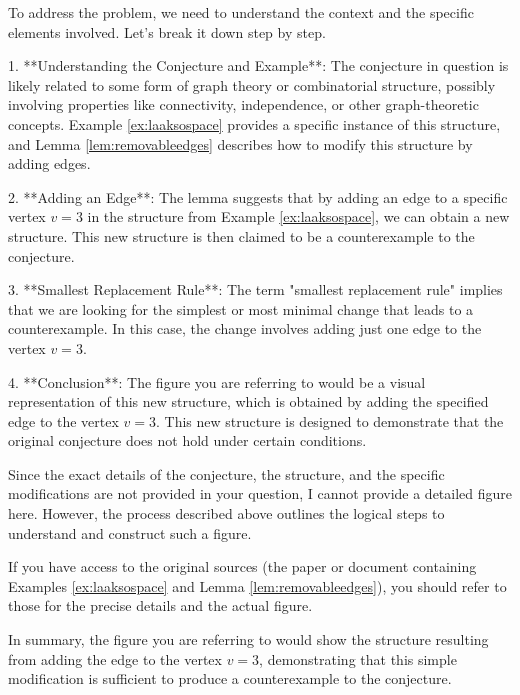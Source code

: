 To address the problem, we need to understand the context and the specific elements involved. Let's break it down step by step.

1. **Understanding the Conjecture and Example**: The conjecture in question is likely related to some form of graph theory or combinatorial structure, possibly involving properties like connectivity, independence, or other graph-theoretic concepts. Example \ref{ex:laaksospace} provides a specific instance of this structure, and Lemma \ref{lem:removableedges} describes how to modify this structure by adding edges.

2. **Adding an Edge**: The lemma suggests that by adding an edge to a specific vertex \( v = 3 \) in the structure from Example \ref{ex:laaksospace}, we can obtain a new structure. This new structure is then claimed to be a counterexample to the conjecture.

3. **Smallest Replacement Rule**: The term "smallest replacement rule" implies that we are looking for the simplest or most minimal change that leads to a counterexample. In this case, the change involves adding just one edge to the vertex \( v = 3 \).

4. **Conclusion**: The figure you are referring to would be a visual representation of this new structure, which is obtained by adding the specified edge to the vertex \( v = 3 \). This new structure is designed to demonstrate that the original conjecture does not hold under certain conditions.

Since the exact details of the conjecture, the structure, and the specific modifications are not provided in your question, I cannot provide a detailed figure here. However, the process described above outlines the logical steps to understand and construct such a figure.

If you have access to the original sources (the paper or document containing Examples \ref{ex:laaksospace} and Lemma \ref{lem:removableedges}), you should refer to those for the precise details and the actual figure.

In summary, the figure you are referring to would show the structure resulting from adding the edge to the vertex \( v = 3 \), demonstrating that this simple modification is sufficient to produce a counterexample to the conjecture.